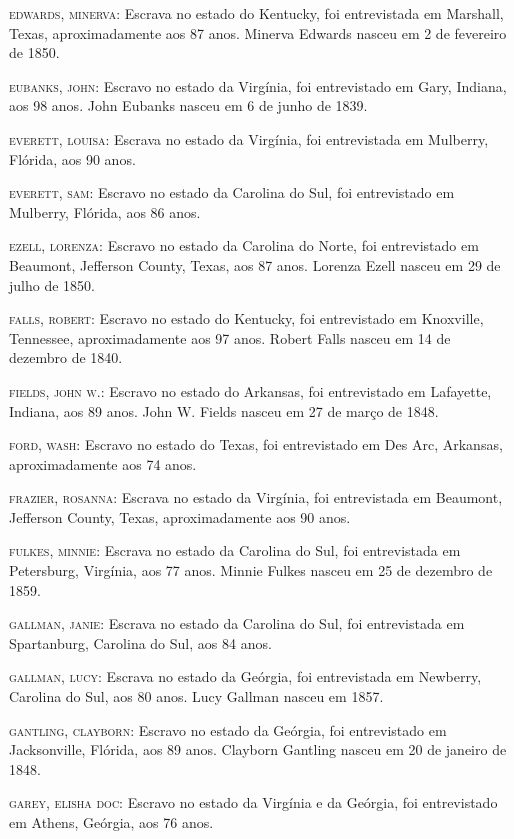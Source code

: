 \begin{Parskip}
\textsc{edwards, minerva:} Escrava no estado do Kentucky, foi
entrevistada em Marshall, Texas, aproximadamente aos 87 anos. Minerva
Edwards nasceu em 2 de fevereiro de 1850.

\textsc{eubanks, john:} Escravo no estado da Virgínia, foi entrevistado
em Gary, Indiana, aos 98 anos. John Eubanks nasceu em 6 de junho de
1839.

\textsc{everett, louisa:} Escrava no estado da Virgínia, foi
entrevistada em Mulberry, Flórida, aos 90 anos.

\textsc{everett, sam:} Escravo no estado da Carolina do Sul, foi
entrevistado em Mulberry, Flórida, aos 86 anos.

\textsc{ezell, lorenza:} Escravo no estado da Carolina do Norte, foi
entrevistado em Beaumont, Jefferson County, Texas, aos 87 anos. Lorenza
Ezell nasceu em 29 de julho de 1850.

\textsc{falls, robert:} Escravo no estado do Kentucky, foi entrevistado
em Knoxville, Tennessee, aproximadamente aos 97 anos. Robert Falls
nasceu em 14 de dezembro de 1840.

\textsc{fields, john w.:} Escravo no estado do Arkansas, foi
entrevistado em Lafayette, Indiana, aos 89 anos. John W. Fields nasceu
em 27 de março de 1848.

\textsc{ford, wash:} Escravo no estado do Texas, foi entrevistado em Des
Arc, Arkansas, aproximadamente aos 74 anos.

\textsc{frazier, rosanna:} Escrava no estado da Virgínia, foi
entrevistada em Beaumont, Jefferson County, Texas, aproximadamente aos
90 anos.

\textsc{fulkes, minnie:} Escrava no estado da Carolina do Sul, foi
entrevistada em Petersburg, Virgínia, aos 77 anos. Minnie Fulkes nasceu
em 25 de dezembro de 1859.

\textsc{gallman, janie:} Escrava no estado da Carolina do Sul, foi
entrevistada em Spartanburg, Carolina do Sul, aos 84 anos.

\textsc{gallman, lucy:} Escrava no estado da Geórgia, foi entrevistada
em Newberry, Carolina do Sul, aos 80 anos. Lucy Gallman nasceu em 1857.

\textsc{gantling, clayborn:} Escravo no estado da Geórgia, foi
entrevistado em Jacksonville, Flórida, aos 89 anos. Clayborn Gantling
nasceu em 20 de janeiro de 1848.

\textsc{garey, elisha doc:} Escravo no estado da Virgínia e da Geórgia,
foi entrevistado em Athens, Geórgia, aos 76 anos.


\end{Parskip}

